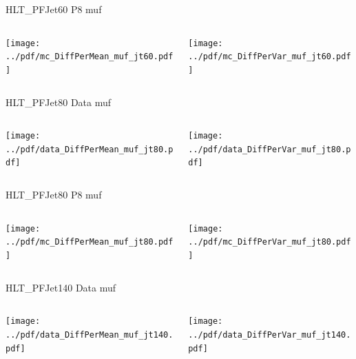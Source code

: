 \documentclass[9pt]{beamer}
\begin{document}
\begin{frame}[t]{HLT\_PFJet60 P8 muf}
\begin{columns}[T]
  \begin{column}{.5\textwidth}
  \texttt{[image: ../pdf/mc\_DiffPerMean\_muf\_jt60.pdf]}
  \end{column}
  \begin{column}{.5\textwidth}
  \texttt{[image: ../pdf/mc\_DiffPerVar\_muf\_jt60.pdf]}
  \end{column}
\end{columns}
\end{frame}

\begin{frame}[t]{HLT\_PFJet80 Data muf}
\begin{columns}[T]
  \begin{column}{.5\textwidth}
  \texttt{[image: ../pdf/data\_DiffPerMean\_muf\_jt80.pdf]}
  \end{column}
  \begin{column}{.5\textwidth}
  \texttt{[image: ../pdf/data\_DiffPerVar\_muf\_jt80.pdf]}
  \end{column}
\end{columns}
\end{frame}

\begin{frame}[t]{HLT\_PFJet80 P8 muf}
\begin{columns}[T]
  \begin{column}{.5\textwidth}
  \texttt{[image: ../pdf/mc\_DiffPerMean\_muf\_jt80.pdf]}
  \end{column}
  \begin{column}{.5\textwidth}
  \texttt{[image: ../pdf/mc\_DiffPerVar\_muf\_jt80.pdf]}
  \end{column}
\end{columns}
\end{frame}

\begin{frame}[t]{HLT\_PFJet140 Data muf}
\begin{columns}[T]
  \begin{column}{.5\textwidth}
  \texttt{[image: ../pdf/data\_DiffPerMean\_muf\_jt140.pdf]}
  \end{column}
  \begin{column}{.5\textwidth}
  \texttt{[image: ../pdf/data\_DiffPerVar\_muf\_jt140.pdf]}
  \end{column}
\end{columns}
\end{frame}
\end{document}
